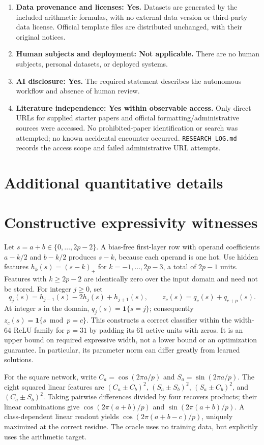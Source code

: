 \documentclass{article}
\begin{document}
\begin{enumerate}
\item \textbf{Data provenance and licenses: Yes.} Datasets are generated by the included arithmetic formulas, with no external data version or third-party data license. Official template files are distributed unchanged, with their original notices.
\item \textbf{Human subjects and deployment: Not applicable.} There are no human subjects, personal datasets, or deployed systems.
\item \textbf{AI disclosure: Yes.} The required statement describes the autonomous workflow and absence of human review.
\item \textbf{Literature independence: Yes within observable access.} Only direct URLs for supplied starter papers and official formatting/administrative sources were accessed. No prohibited-paper identification or search was attempted; no known accidental encounter occurred. \texttt{RESEARCH\_LOG.md} records the access scope and failed administrative URL attempts.
\end{enumerate}

\section{Additional quantitative details}


\section{Constructive expressivity witnesses}
\label{sec:expressivity}
Let $s=a+b\in\{0,\ldots,2p-2\}$. A bias-free first-layer row with operand coefficients $a-k/2$ and $b-k/2$ produces $s-k$, because each operand is one hot. Use hidden features $h_k(s)=(s-k)_+$ for $k=-1,\ldots,2p-3$, a total of $2p-1$ units. Features with $k\ge2p-2$ are identically zero over the input domain and need not be stored. For integer $j\ge0$, set
\[
 q_j(s)=h_{j-1}(s)-2h_j(s)+h_{j+1}(s),\qquad z_c(s)=q_c(s)+q_{c+p}(s).
\]
At integer $s$ in the domain, $q_j(s)=\mathbf 1\{s=j\}$; consequently $z_c(s)=\mathbf 1\{s\bmod p=c\}$. This constructs a correct classifier within the width-64 ReLU family for $p=31$ by padding its 61 active units with zeros. It is an upper bound on required expressive width, not a lower bound or an optimization guarantee. In particular, its parameter norm can differ greatly from learned solutions.

For the square network, write $C_a=\cos(2\pi a/p)$ and $S_a=\sin(2\pi a/p)$. The eight squared linear features are $(C_a\pm C_b)^2$, $(S_a\pm S_b)^2$, $(S_a\pm C_b)^2$, and $(C_a\pm S_b)^2$. Taking pairwise differences divided by four recovers products; their linear combinations give $\cos(2\pi(a+b)/p)$ and $\sin(2\pi(a+b)/p)$. A class-dependent linear readout yields $\cos(2\pi(a+b-c)/p)$, uniquely maximized at the correct residue. The oracle uses no training data, but explicitly uses the arithmetic target.
\end{document}

